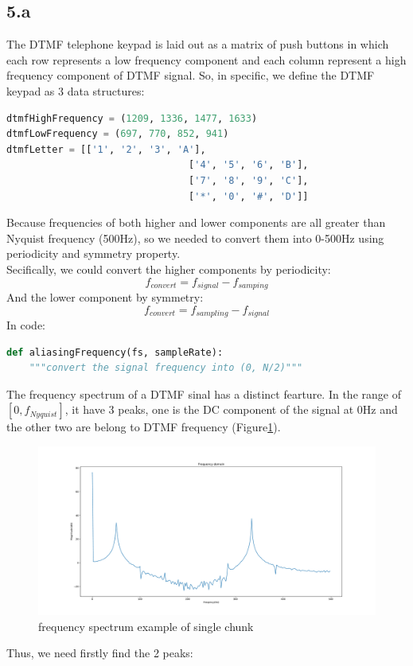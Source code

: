 \documentclass[a4paper,12pt]{article}
\begin{document}
\subsection{5.a}
The DTMF telephone keypad is laid out as a matrix of push buttons in which each row represents a low frequency component and each column represent a high frequency component of DTMF signal. So, in specific, we define the DTMF keypad as 3 data structures:
\begin{lstlisting}[language=Python]
dtmfHighFrequency = (1209, 1336, 1477, 1633)
dtmfLowFrequency = (697, 770, 852, 941)
dtmfLetter = [['1', '2', '3', 'A'],
								['4', '5', '6', 'B'],
								['7', '8', '9', 'C'],
								['*', '0', '#', 'D']]
\end{lstlisting}
Because frequencies of both higher and lower components are all greater than Nyquist frequency (500Hz), so we needed to convert them  into 0-500Hz using periodicity and symmetry property. \\
Secifically, we could convert the higher components by periodicity:
$$f_{convert}=f_{signal}-f_{samping}$$
And the lower component by symmetry:
$$f_{convert}=f_{sampling}-f_{signal}$$
In code:
\begin{lstlisting}[language=Python]
def aliasingFrequency(fs, sampleRate):
	"""convert the signal frequency into (0, N/2)"""
\end{lstlisting}
The frequency spectrum of a DTMF sinal has a distinct fearture. In the range of $[0,  f_{Nyquist}]$, it have 3 peaks, one is the DC component of the signal at 0Hz and the other two are belong to DTMF frequency (Figure\ref{fig_task5EampleF}).\\
\begin{figure}[h]   
	\centering 
	\includegraphics[width=12cm]{../Output/Figures/task5ExampleF.pdf} 
	\caption{frequency spectrum example of  single chunk}   
	\label{fig_task5EampleF}
\end{figure}
Thus, we need firstly find the 2 peaks:
\end{document}

